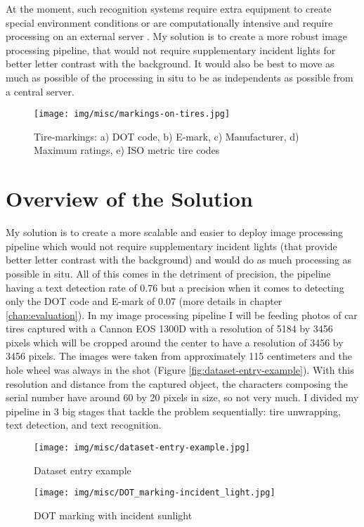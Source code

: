 At the moment, such recognition systems require extra equipment to create special environment conditions \cite{article:1} or are computationally intensive and require processing on an external server \cite{site:0}. My solution is to create a more robust image processing pipeline, that would not require supplementary incident lights for better letter contrast with the background. It would also be best to move as much as possible of the processing in situ to be as independents as possible from a central server.

\begin{figure}
    \centering
    \texttt{[image: img/misc/markings-on-tires.jpg]}
    \caption{Tire-markings: a) DOT code, b) E-mark, c) Manufacturer, d) Maximum ratings, e) ISO metric tire codes}
    \label{fig:tire_markings}
\end{figure}

\section{Overview of the Solution}

My solution is to create a more scalable and easier to deploy image processing pipeline which would not require supplementary incident lights (that provide better letter contrast with the background) and would do as much processing as possible in situ. All of this comes in the detriment of precision, the pipeline having a text detection rate of 0.76 but a precision when it comes to detecting only the DOT code and E-mark of 0.07 (more details in chapter \ref{chap:evaluation}). In my image processing pipeline I will be feeding photos of car tires captured with a Cannon EOS 1300D with a resolution of 5184 by 3456 pixels which will be cropped around the center to have a resolution of 3456 by 3456 pixels. The images were taken from approximately 115 centimeters and the hole wheel was always in the shot (Figure \ref{fig:dataset-entry-example}). With this resolution and distance from the captured object, the characters composing the serial number have around 60 by 20 pixels in size, so not very much. I divided my pipeline in 3 big stages that tackle the problem sequentially: tire unwrapping, text detection, and text recognition.

\begin{figure}
    \centering
    \begin{minipage}[c]{0.5\linewidth}
        \centering
        \texttt{[image: img/misc/dataset-entry-example.jpg]}
        \caption{Dataset entry example}
        \label{fig:dataset-entry-example}
    \end{minipage}\hfill
    \begin{minipage}[c]{0.5\linewidth}
        \centering
        \texttt{[image: img/misc/DOT\_marking-incident\_light.jpg]}
        \caption{DOT marking with incident sunlight}
        \label{fig:tire_marking-DOT-incident_light}
    \end{minipage}\hfill
\end{figure}

